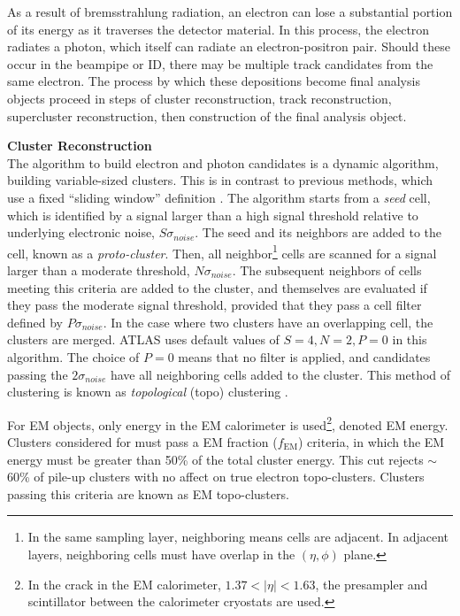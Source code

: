 As a result of bremsstrahlung radiation, an electron can lose a substantial portion of its energy as it traverses the detector material. In this process, the electron radiates a photon, which itself can radiate an electron-positron pair. Should these occur in the beampipe or \gls{ID}, there may be multiple track candidates from the same electron. The process by which these depositions become final analysis objects proceed in steps of cluster reconstruction, track reconstruction, supercluster reconstruction, then construction of the final analysis object.


\noindent\textbf{Cluster Reconstruction}\\
\indent The algorithm to build electron and photon candidates is a dynamic algorithm, building variable-sized clusters. This is in contrast to previous methods, which use a fixed ``sliding window'' definition \cite{sliding-window}. The algorithm starts from a \textit{seed} cell, which is identified by a signal larger than a high signal threshold relative to underlying electronic noise, $S\sigma_{noise}$. The seed and its neighbors are added to the cell, known as a \textit{proto-cluster}. Then, all neighbor\footnote{In the same sampling layer, neighboring means cells are adjacent. In adjacent layers, neighboring cells must have overlap in the $(\eta,\phi)$ plane.} cells are scanned for a signal larger than a moderate threshold, $N\sigma_{noise}$. The subsequent neighbors of cells meeting this criteria are added to the cluster, and themselves are evaluated if they pass the moderate signal threshold, provided that they pass a cell filter defined by $P\sigma_{noise}$. In the case where two clusters have an overlapping cell, the clusters are merged. ATLAS uses default values of $S=4,N=2,P=0$ in this algorithm. The choice of $P=0$ means that no filter is applied, and candidates passing the $2\sigma_{noise}$ have all neighboring cells added to the cluster. This method of clustering is known as  \textit{topological} (topo) clustering \cite{topo-cluster}. 

For \gls{EM} objects, only energy in the \gls{EM} calorimeter is used\footnote{In the crack in the \gls{EM} calorimeter, $1.37<|\eta|<1.63$, the presampler and scintillator between the calorimeter cryostats are used.}, denoted \gls{EM} energy. Clusters considered for must pass a \gls{EM} fraction ($f_{\text{EM}}$) criteria, in which the \gls{EM} energy must be greater than 50\% of the total cluster energy. This cut rejects $\sim$60\% of pile-up clusters with no affect on true electron topo-clusters. Clusters passing this criteria are known as \gls{EM} topo-clusters.

